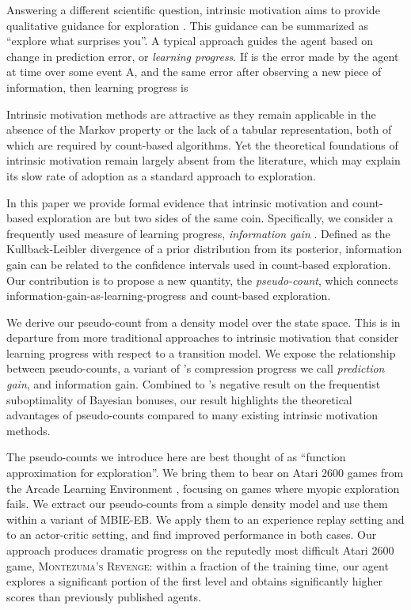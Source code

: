 \documentclass{article}
\newcommand{\gamename}[1]{\textsc{#1}}
\begin{document}
Answering a different scientific question, intrinsic motivation aims to provide qualitative guidance for exploration \citep{schmidhuber91possibility,oudeyer07intrinsic,barto13intrinsic}. This guidance can be summarized as ``explore what surprises you''. A typical approach guides the agent based on change in prediction error, or \emph{learning progress}. If  is the error made by the agent at time  over some event A, and  the same error after observing a new piece of information, then learning progress is

Intrinsic motivation methods are attractive as they remain applicable in the absence of the Markov property or the lack of a tabular representation, both of which are required by count-based algorithms. Yet the theoretical foundations of intrinsic motivation remain largely absent from the literature, which may explain its slow rate of adoption as a standard approach to exploration.

In this paper we provide formal evidence that intrinsic motivation and count-based exploration are but two sides of the same coin. Specifically, we consider a frequently used measure of learning progress, \emph{information gain} \citep{cover91elements}. Defined as the Kullback-Leibler divergence of a prior distribution from its posterior, information gain can be related to the confidence intervals used in count-based
exploration. Our contribution is to propose a new quantity, the \emph{pseudo-count}, which connects information-gain-as-learning-progress and count-based exploration.

We derive our pseudo-count from a density model over the state space. This is in departure from more traditional approaches to intrinsic motivation that consider learning progress with respect to a transition model.
We expose the relationship between pseudo-counts, a variant of \citeauthor{schmidhuber91possibility}'s compression progress we call \emph{prediction gain}, and information gain. Combined to \citeauthor{kolter09near}'s negative result on the frequentist suboptimality of Bayesian bonuses, our result highlights the theoretical advantages of pseudo-counts compared to many existing intrinsic motivation methods.

The pseudo-counts we introduce here are best thought of as ``function approximation for exploration''. We bring them to bear on Atari 2600 games from the Arcade Learning Environment \citep{bellemare13arcade}, focusing on games where myopic exploration fails. We extract our pseudo-counts from a simple density model and use them within a variant of MBIE-EB. 
We apply them to an experience replay setting and to an actor-critic setting, and find improved performance in both cases. Our approach produces dramatic progress on the reputedly most difficult Atari 2600 game, \gamename{Montezuma's Revenge}: within a fraction of the training time, our agent explores a significant portion of the first level and obtains significantly higher scores than previously published agents.
\end{document}
